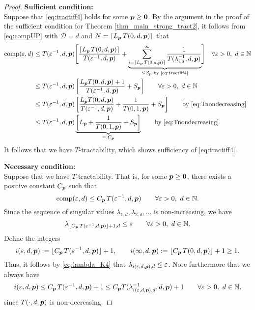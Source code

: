 \documentclass[sort&compress]{elsarticle}
\newcommand{\thed}{\mathscr{D}}
\begin{document}
\begin{proof}
    \textbf{Sufficient condition:}\\
Suppose that \eqref{eq:tractiff4} holds for some $\boldsymbol{p} \ge \boldsymbol{0}$.
By the argument in the proof of the sufficient condition for Theorem \ref{thm_main_strong_tract2}, it follows from \eqref{eq:compUP} with $\thed=d$ and $N = \lceil L_{\boldsymbol{p}}\, T(0,d,\boldsymbol{p})\rceil$ that
\begin{align*}
       \operatorname{comp}(\varepsilon,d)
       & \le T(\varepsilon^{-1},d,\boldsymbol{p}) \Biggl [
       \frac{\lceil L_{\boldsymbol{p}}\, T(0,d,\boldsymbol{p})\rceil}{T(\varepsilon^{-1},d,\boldsymbol{p})}  +
       \underbrace{\sum_{i=\lceil L_{\boldsymbol{p}}\, T(0,d,\boldsymbol{p})\rceil}^\infty \frac{1}{T(\lambda_{i, d}^{-1},d,\boldsymbol{p})}}_{\le S_{\boldsymbol{p}} \text{ by \eqref{eq:tractiff4}}}
       \Biggr ]
        \quad \forall \varepsilon > 0, \ d  \in \mathbb{N}\\
       & \le T(\varepsilon^{-1},d,\boldsymbol{p})\left[\frac{L_{\boldsymbol{p}} T(0,d,\boldsymbol{p})+1}{T(\varepsilon^{-1},d, \boldsymbol{p})} +  S_{\boldsymbol{p}} \right]
        \qquad \forall \varepsilon > 0, \ d  \in \mathbb{N}\\
       & \le T(\varepsilon^{-1},d,\boldsymbol{p})\left[\frac{L_{\boldsymbol{p}} T(0,d,\boldsymbol{p})}{T(\varepsilon^{-1},d, \boldsymbol{p})}
       + \frac{1}{T(0,1, \boldsymbol{p})} + S_{\boldsymbol{p}}\right]
       \qquad \text{by \eqref{eq:Tnondecreasing}}   \\
       & \le T(\varepsilon^{-1},d,\boldsymbol{p})
       \underbrace{\left [  L_{\boldsymbol{p}} + \frac{1}{T(0,1, \boldsymbol{p})} + S_{\boldsymbol{p}} \right]}_{=:C_{\boldsymbol{p}}}
       \qquad \text{by \eqref{eq:Tnondecreasing}} .
\end{align*}
It follows that we have $T$-tractability, which shows sufficiency of \eqref{eq:tractiff4}.

\bigskip

\noindent \textbf{Necessary condition:}\\
Suppose that we have
$T$-tractability. That is, for some $\boldsymbol{p} \ge \boldsymbol{0}$, there exists a positive constant $C_{\boldsymbol{p}}$ such that
\[
\operatorname{comp}(\varepsilon,d)\le C_{\boldsymbol{p}}\, T(\varepsilon^{-1},d,\boldsymbol{p}) \qquad \forall \varepsilon > 0,  \ d \in \mathbb{N}.
\]
Since the sequence of singular values $\lambda_{1,d}, \lambda_{2,d}, \ldots $ is non-increasing, we have
\begin{equation}\label{eq:lambda_K4}
	\lambda_{\lfloor C_{\boldsymbol{p}}\, T(\varepsilon^{-1},d,\boldsymbol{p})\rfloor +1,d}\le \varepsilon \qquad \forall \varepsilon > 0,  \ d \in \mathbb{N}.
\end{equation}
Define the integers
\[
i (\varepsilon,d,\boldsymbol{p}):= \lfloor C_{\boldsymbol{p}}\, T(\varepsilon^{-1},d,\boldsymbol{p})\rfloor +1, \qquad
i (\infty,d,\boldsymbol{p}) := \lfloor C_{\boldsymbol{p}}\, T(0,d,\boldsymbol{p})\rfloor +1 \ge 1.
\]
Thus, it follows by \eqref{eq:lambda_K4} that $\lambda_{i(\varepsilon,d,\boldsymbol{p}),d} \le \varepsilon$.
Note furthermore that we always have
\[
i(\varepsilon,d,\boldsymbol{p})\le C_{\boldsymbol{p}}\, T(\varepsilon^{-1},d,\boldsymbol{p})+1 \le C_{\boldsymbol{p}} T(\lambda_{i(\varepsilon,d,\boldsymbol{p}),d}^{-1},d,\boldsymbol{p})+1 \qquad \forall \varepsilon > 0, \ d \in \mathbb{N},
\]
since
$T(\cdot,d,\boldsymbol{p})$ is non-decreasing.


\end{proof}
\end{document}
